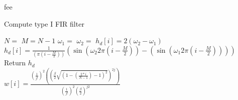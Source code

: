 fee
\begin{algorithm}
\caption{Compute type I FIR filter}
\label{array-sum}
\begin{algorithmic}[1] 
\State $N = $  
\State $M = N-1$ 
\State $\omega_1 = $
\State $\omega_2 = $
        	\State $h_d[i] = 2(\omega_2 - \omega_1)$
        \Else 
        	\State  $h_d[i] = \frac{1}{ (\pi (i - \frac{M}{2}))}(\sin(\omega_2 2 \pi (i - \frac{M}{2})) - (\sin(\omega_1 2 \pi (i - \frac{M}{2}))))$ 
        \EndIf 
	\EndFor
	\State Return $h_d$
\EndProcedure
\\
			\State $w[i] =\frac{(\frac{1}{j!})^2 \left( \left( \frac{\beta}{2} \sqrt{\left(1 - \left( \frac{2*i}{N-1}\right) - 1\right)^2}\right)^{2j}\right)}{(\frac{1}{j!})^2 \left( \frac{\beta}{2}\right)^{j2}}$
		\EndFor
	\EndFor
\EndProcedure 

\end{algorithmic}
\end{algorithm}